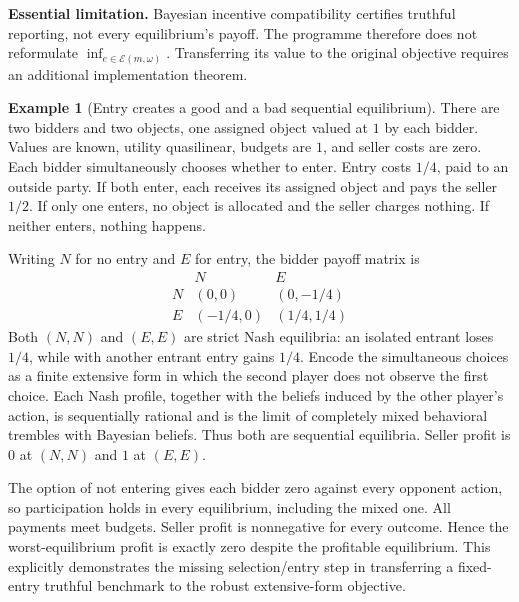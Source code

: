\documentclass[11pt,a4paper]{article}
\theoremstyle{definition}
\newtheorem{example}[theorem]{Example}
\begin{document}
\textbf{Essential limitation.} Bayesian incentive compatibility certifies truthful reporting, not every equilibrium's payoff. The programme therefore does not reformulate $\inf_{e\in\mathcal E(m,\omega)}$. Transferring its value to the original objective requires an additional implementation theorem.

\begin{example}[Entry creates a good and a bad sequential equilibrium]
There are two bidders and two objects, one assigned object valued at $1$ by each bidder. Values are known, utility quasilinear, budgets are $1$, and seller costs are zero. Each bidder simultaneously chooses whether to enter. Entry costs $1/4$, paid to an outside party. If both enter, each receives its assigned object and pays the seller $1/2$. If only one enters, no object is allocated and the seller charges nothing. If neither enters, nothing happens.

Writing $N$ for no entry and $E$ for entry, the bidder payoff matrix is
\[
\begin{array}{c|cc}
 &N&E\\\hline
 N&(0,0)&(0,-1/4)\\
 E&(-1/4,0)&(1/4,1/4)
\end{array}
\]
Both $(N,N)$ and $(E,E)$ are strict Nash equilibria: an isolated entrant loses $1/4$, while with another entrant entry gains $1/4$. Encode the simultaneous choices as a finite extensive form in which the second player does not observe the first choice. Each Nash profile, together with the beliefs induced by the other player's action, is sequentially rational and is the limit of completely mixed behavioral trembles with Bayesian beliefs. Thus both are sequential equilibria. Seller profit is $0$ at $(N,N)$ and $1$ at $(E,E)$.

The option of not entering gives each bidder zero against every opponent action, so participation holds in every equilibrium, including the mixed one. All payments meet budgets. Seller profit is nonnegative for every outcome. Hence the worst-equilibrium profit is exactly zero despite the profitable equilibrium. This explicitly demonstrates the missing selection/entry step in transferring a fixed-entry truthful benchmark to the robust extensive-form objective.
\end{example}
\end{document}
